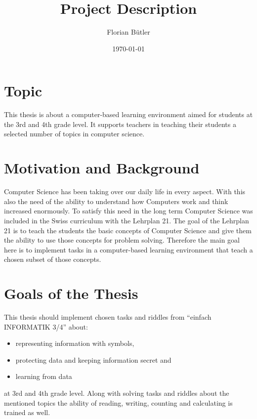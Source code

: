 \documentclass[a4paper, oneside]{description}
\title{Project Description}
\author{Florian Bütler}
\institute{Chair of Information Technology and Education \\[2pt]
ETH Zürich}
\date{\today}
\begin{document}
\frontmatter %
\maketitle

\cleardoublepage

\mainmatter %

\section*{Topic}

This thesis is about a computer-based learning environment aimed for students at the 3rd and 4th grade level. It supports teachers in teaching their students a selected number of topics in computer science.

\section*{Motivation and Background}

Computer Science has been taking over our daily life in every aspect. With this also the need of the ability to understand how Computers work and think increased enormously. To satisfy this need in the long term Computer Science was included in the Swiss curriculum with the Lehrplan 21.
The goal of the Lehrplan 21 is to teach the students the basic concepts of Computer Science and give them the ability to use those concepts for problem solving. Therefore the main goal here is to implement tasks in a computer-based learning environment that teach a chosen subset of those concepts.

\section*{Goals of the Thesis}

This thesis should implement chosen tasks and riddles from “einfach INFORMATIK 3/4” about:
\begin{itemize}
  \item representing information with symbols,
  \item protecting data and keeping information secret and
  \item learning from data
\end{itemize}
at 3rd and 4th grade level.
Along with solving tasks and riddles about the mentioned topics the ability of reading, writing, counting and calculating is trained as well.
\end{document}
